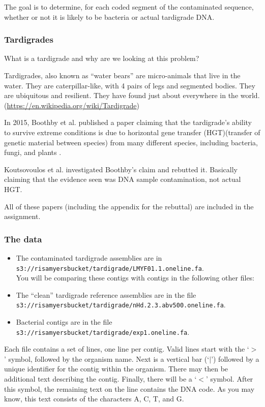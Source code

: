 \documentclass[11pt]{article}
\renewcommand\:{\colon} %
\begin{document}
The goal is to determine, for each coded segment of the contaminated sequence, whether or not it is likely to be bacteria or actual tardigrade DNA.

\subsubsection*{Tardigrades}
What is a tardigrade and why are we looking at this problem?

Tardigrades, also known as ``water bears'' are micro-animals that live in the water. They are caterpillar-like, with 4 pairs of legs and segmented bodies. They are ubiquitous and resilient. They have found just about everywhere in the world.  (\url{https://en.wikipedia.org/wiki/Tardigrade})

In 2015, Boothby et al. published a paper claiming that the tardigrade's ability to survive extreme conditions is due to horizontal gene transfer (HGT)(transfer of genetic material between species) from many different species, including bacteria, fungi, and plants \cite{boothby}. 

Koutsovoulos et al. investigated Boothby's claim and rebutted it. Basically claiming that the evidence seen was DNA sample contamination, not actual HGT\cite{Koutsovoulos}.

All of these papers (including the appendix for the rebuttal) are included in the assignment.

\subsubsection*{The data}
\begin{itemize}
\item The contaminated tardigrade assemblies are in \\
 \texttt{s3://risamyersbucket/tardigrade/LMYF01.1.oneline.fa}. \\
You will be comparing these contigs with contigs in the following other files:

\item The ``clean'' tardigrade reference assemblies are in the file \\
 \texttt{s3://risamyersbucket/tardigrade/nHd.2.3.abv500.oneline.fa}. 
\item Bacterial contigs are in the file \\
\texttt{s3://risamyersbucket/tardigrade/exp1.oneline.fa}. 
\end{itemize}

Each file contains a set of lines, one line per contig. Valid lines start with the `$>$' symbol, followed by the organism name. Next is a vertical bar (`$|$') followed by a unique identifier for the contig within the organism. There may then be additional text describing the contig. Finally, there will be a `$<$' symbol. After this symbol, the remaining text on the line contains the DNA code. As you may know, this text consists of the characters A, C, T, and G.
\end{document}

